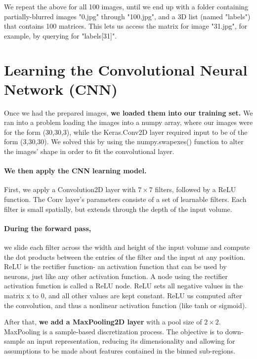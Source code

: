 \documentclass{article}
\begin{document}
We repeat the above for all 100 images, until we end up with a folder containing 
partially-blurred images "0.jpg" through "100.jpg", and a 3D list (named "labels") 
that contains 100 matrices. This lets us access the matrix for image "31.jpg", for 
example, by querying for "labels[31]".

\section{Learning the Convolutional Neural Network (CNN)}
Once we had the prepared images, \textbf{we loaded them into our training set.} We ran 
into a problem loading the images into a numpy array, where our images were for the form 
(30,30,3), while the Keras.Conv2D layer required input to be of the form (3,30,30). 
We solved this by using the numpy.swapexes() function to alter the images' shape in
order to fit the convolutional layer.

\paragraph{We then apply the CNN learning model.}
First, we apply a Convolution2D layer with $7\times7$ filters, followed by a ReLU 
function. The Conv layer's parameters consiste of a set of learnable filters. Each 
filter is small spatially, but extends through the depth of the input volume. 

\paragraph{During the forward pass,} 
we slide each filter across the width and height of the input 
volume and compute the dot products between the entries of the filter and the input at 
any position. ReLU is the rectifier function- an activation function that can be used by 
neurons, just like any other activation function. A node using the rectifier activation 
function is called a ReLU node. ReLU sets all negative values in the matrix x to 0, 
and all other values are kept constant. ReLU us computed after the convolution, and 
thus a nonlinear activation function (like tanh or sigmoid).

After that, \textbf{we add a MaxPooling2D layer} with a pool size of $2\times2$. 
MaxPooling is a sample-based discretization process. The objective is to down-sample an 
input representation, reducing its dimensionality and allowing for assumptions to be made 
about features contained in the binned sub-regions. 
\end{document}
